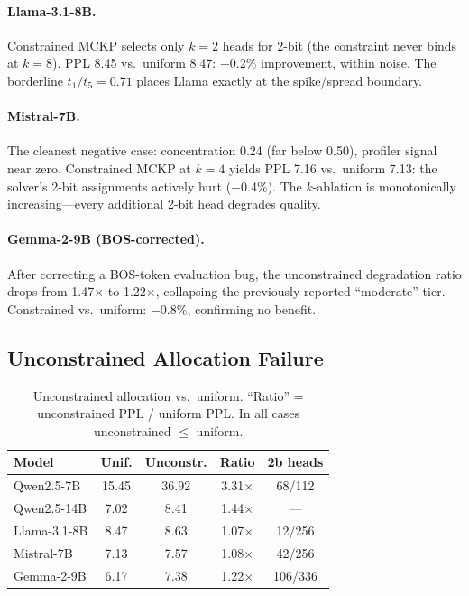 \documentclass[11pt,a4paper]{article}
\begin{document}
\paragraph{Llama-3.1-8B.}
Constrained MCKP selects only $k{=}2$ heads for 2-bit (the constraint never binds at $k{=}8$). PPL 8.45 vs.\ uniform 8.47: +0.2\% improvement, within noise. The borderline $t_1/t_5 = 0.71$ places Llama exactly at the spike/spread boundary.

\paragraph{Mistral-7B.}
The cleanest negative case: concentration 0.24 (far below 0.50), profiler signal near zero. Constrained MCKP at $k{=}4$ yields PPL 7.16 vs.\ uniform 7.13: the solver's 2-bit assignments actively hurt ($-$0.4\%). The $k$-ablation is monotonically increasing---every additional 2-bit head degrades quality.

\paragraph{Gemma-2-9B (BOS-corrected).}
After correcting a BOS-token evaluation bug, the unconstrained degradation ratio drops from 1.47$\times$ to 1.22$\times$, collapsing the previously reported ``moderate'' tier. Constrained vs.\ uniform: $-$0.8\%, confirming no benefit.

\subsection{Unconstrained Allocation Failure}
\label{sec:unconstrained}

\begin{table}[t]
\centering
\small
\begin{tabular}{lcccc}
\toprule
\textbf{Model} & \textbf{Unif.} & \textbf{Unconstr.} & \textbf{Ratio} & \textbf{2b heads} \\
\midrule
Qwen2.5-7B  & 15.45 & 36.92 & 3.31$\times$ & 68/112 \\
Qwen2.5-14B &  7.02 &  8.41 & 1.44$\times$ & --- \\
Llama-3.1-8B & 8.47 &  8.63 & 1.07$\times$ & 12/256 \\
Mistral-7B  &  7.13 &  7.57 & 1.08$\times$ & 42/256 \\
Gemma-2-9B  &  6.17 &  7.38 & 1.22$\times$ & 106/336 \\
\bottomrule
\end{tabular}
\caption{Unconstrained allocation vs.\ uniform. ``Ratio'' = unconstrained PPL / uniform PPL. In all cases unconstrained $\leq$ uniform.}
\label{tab:unconstrained}
\end{table}
\end{document}

